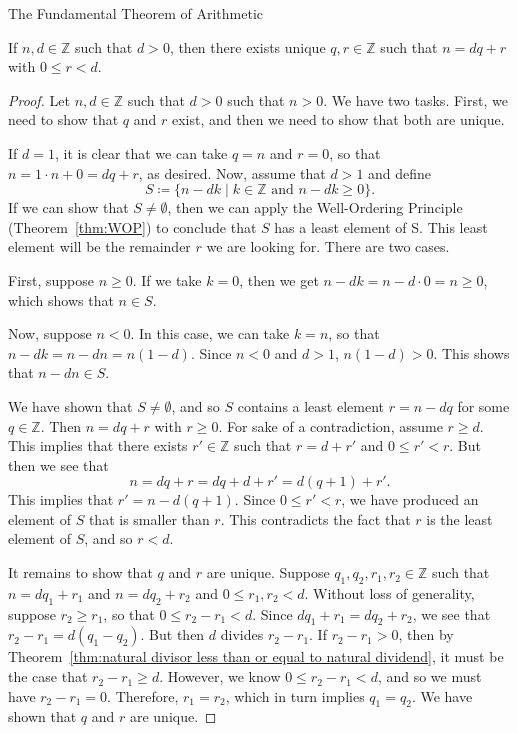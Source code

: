 \begin{section}{The Fundamental Theorem of Arithmetic}
\begin{theorem}\label{thm:DivisonAlgorthm}
If $n,d\in\mathbb{Z}$ such that $d>0$, then there exists unique $q,r\in\mathbb{Z}$ such that $n=dq+r$ with $0\leq r<d$.
\end{theorem}

\begin{proof}
Let $n,d\in\mathbb{Z}$ such that $d>0$ such that $n>0$. We have two tasks. First, we need to show that $q$ and $r$ exist, and then we need to show that both are unique.

If $d=1$, it is clear that we can take $q=n$ and $r=0$, so that $n=1\cdot n+0=dq+r$, as desired.  Now, assume that $d>1$ and define
\[
S\coloneqq \{n-dk\mid k\in\mathbb{Z}\text{ and } n-dk\geq 0\}.
\]
If we can show that $S\neq\emptyset$, then we can apply the Well-Ordering Principle (Theorem~\ref{thm:WOP}) to conclude that $S$ has a least element of S. This least element will be the remainder $r$ we are looking for. There are two cases.

First, suppose $n\geq 0$. If we take $k=0$, then we get $n-dk=n-d\cdot 0=n\geq 0$, which shows that $n\in S$.

Now, suppose $n<0$. In this case, we can take $k=n$, so that $n-dk=n-dn=n(1-d)$. Since $n<0$ and $d>1$, $n(1-d)>0$.  This shows that $n-dn\in S$.

We have shown that $S\neq\emptyset$, and so $S$ contains a least element $r=n-dq$ for some $q\in\mathbb{Z}$. Then $n=dq+r$ with $r\geq 0$. For sake of a contradiction, assume $r\geq d$. This implies that there exists $r'\in \mathbb{Z}$ such that $r=d+r'$ and $0\leq r'<r$. But then we see that
\[
n=dq+r=dq+d+r'=d(q+1)+r'.
\]
This implies that $r' = n-d(q+1)$.  Since $0\leq r'<r$, we have produced an element of $S$ that is smaller than $r$. This contradicts the fact that $r$ is the least element of $S$, and so $r<d$.

It remains to show that $q$ and $r$ are unique.  Suppose $q_1,q_2, r_1,r_2\in\mathbb{Z}$ such that $n=dq_1+r_1$ and $n=dq_2+r_2$ and $0\leq r_1,r_2<d$.  Without loss of generality, suppose $r_2\geq r_1$, so that $0\leq r_2-r_1<d$. Since $dq_1+r_1=dq_2+r_2$, we see that $r_2-r_1=d(q_1-q_2)$. But then $d$ divides $r_2-r_1$. If $r_2-r_1>0$, then by Theorem~\ref{thm:natural divisor less than or equal to natural dividend}, it must be the case that $r_2-r_1\geq d$.  However, we know $0\leq r_2-r_1<d$, and so we must have $r_2-r_1=0$. Therefore, $r_1=r_2$, which in turn implies $q_1=q_2$.  We have shown that $q$ and $r$ are unique.
\end{proof}


\end{section}
